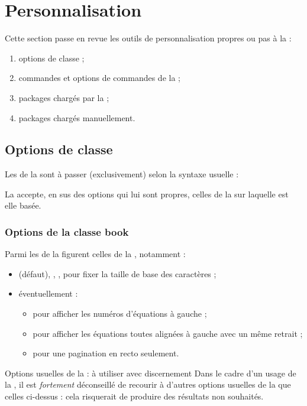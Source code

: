 \chapter{Personnalisation}\label{cha:configuration}

Cette section passe en revue les outils de personnalisation propres
ou pas à la \yatcl{} :
\begin{enumerate}
\item options de classe ;
\item commandes et options de commandes de la \yatcl;
\item packages chargés par  la \yatcl ;
\item packages chargés manuellement.
\end{enumerate}

\section{Options de classe}\label{options-classe}

Les  de la \yatcl sont à passer (exclusivement) selon la syntaxe
usuelle :

La \yatcl accepte, en sus des options qui lui sont propres, celles de la
 sur laquelle est elle basée.

\subsection{Options de la classe \textsf{book}}\label{sec:options-usuelles-de}

Parmi les  de la \yatcl figurent celles de la
, notamment :
\begin{itemize}
\item \docAuxKey{10pt} (défaut), \docAuxKey{11pt}, \docAuxKey{12pt}, pour fixer la taille de base des
  caractères ;
\item éventuellement :
  \begin{itemize}
  \item {} pour afficher les numéros d'équations à gauche ;
  \item {} pour afficher les équations toutes alignées à gauche
    avec un même retrait ;
  \item {} pour une pagination en recto seulement.
  \end{itemize}
\end{itemize}
\begin{dbwarning}{Options usuelles de la  : à utiliser
    avec discernement}{}
  Dans le cadre d'un usage de la \yatcl, il est \emph{fortement}
  déconseillé de recourir à d'autres options usuelles de la
   que celles ci-dessus : cela risquerait de produire
  des résultats non souhaités.
\end{dbwarning}

